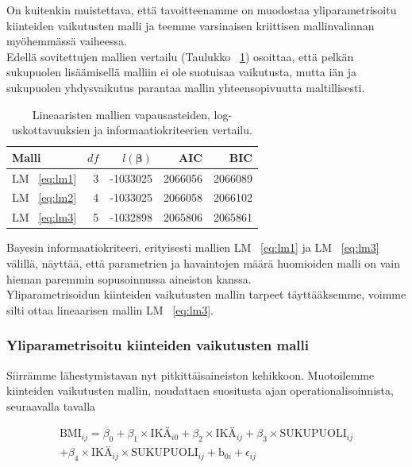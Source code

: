 \documentclass[finnish]{docopts}
\begin{document}
On kuitenkin muistettava, että tavoitteenamme on muodostaa yliparametrisoitu kiinteiden vaikutusten malli ja teemme varsinaisen kriittisen mallinvalinnan myöhemmässä vaiheessa.\\

Edellä sovitettujen mallien vertailu (Taulukko ~\ref{table:lm_summary}) osoittaa, että pelkän sukupuolen lisäämisellä malliin ei ole suotuisaa vaikutusta, mutta iän ja sukupuolen yhdysvaikutus parantaa mallin yhteensopivuutta maltillisesti. 

\begin{table}[H]
\centering
\begin{tabular}{lrrrr}
\toprule
Malli & $df$ & $l(\bm{\beta})$ & AIC & BIC\\
\midrule
LM ~\ref{eq:lm1} & 3 & -1033025 & 2066056 & 2066089\\
LM ~\ref{eq:lm2} & 4 & -1033025 & 2066058 & 2066102\\
LM ~\ref{eq:lm3} & 5 & -1032898 & 2065806 & 2065861\\
\bottomrule
\end{tabular}
\caption{Lineaaristen mallien vapausasteiden, log-uskottavuuksien ja informaatiokriteerien vertailu.}
\label{table:lm_summary}
\end{table}

Bayesin informaatiokriteeri, erityisesti mallien LM ~\ref{eq:lm1} ja LM ~\ref{eq:lm3} välillä, näyttää, että parametrien ja havaintojen määrä huomioiden malli on vain hieman paremmin sopusoinnussa aineiston kanssa.\\

Yliparametrisoidun kiinteiden vaikutusten mallin tarpeet täyttääksemme, voimme silti ottaa lineaarisen mallin LM ~\ref{eq:lm3}.\\

\subsubsection{Yliparametrisoitu kiinteiden vaikutusten malli}
\label{ssb:yliparammalli}

Siirrämme lähestymistavan nyt pitkittäisaineiston kehikkoon. Muotoilemme kiinteiden vaikutusten mallin, noudattaen \cite{fitzmaurice11} suositusta ajan operationalisoinnista, seuraavalla tavalla

\begin{equation}
\begin{split}
 \text{BMI}_{ij} = \beta_0 + \beta_1 \times \text{IKÄ}_{i0} + \beta_2 \times \text{IKÄ}_{ij} + \beta_3 \times \text{SUKUPUOLI}_{ij}  \\
 + \beta_4 \times \text{IKÄ}_{ij} \times \text{SUKUPUOLI}_{ij} + \text{b}_{0i} + \epsilon_{ij}
\label{eq:lme1}
\end{split}
\end{equation}
\end{document}
